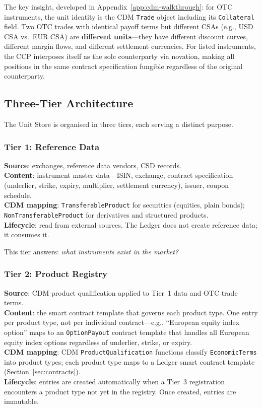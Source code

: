 \documentclass[11pt,a4paper]{article}
\begin{document}
\medskip
\noindent The key insight, developed in Appendix~\ref{app:cdm-walkthrough}: for OTC instruments, the unit identity is the CDM \texttt{Trade} object including its \texttt{Collateral} field. Two OTC trades with identical payoff terms but different CSAs (e.g., USD CSA vs.\ EUR CSA) are \textbf{different units}---they have different discount curves, different margin flows, and different settlement currencies. For listed instruments, the CCP interposes itself as the sole counterparty via novation, making all positions in the same contract specification fungible regardless of the original counterparty.

\subsection{Three-Tier Architecture}

The Unit Store is organised in three tiers, each serving a distinct purpose.

\subsubsection{Tier 1: Reference Data}

\textbf{Source}: exchanges, reference data vendors, CSD records.\\
\textbf{Content}: instrument master data---ISIN, exchange, contract specification (underlier, strike, expiry, multiplier, settlement currency), issuer, coupon schedule.\\
\textbf{CDM mapping}: \texttt{TransferableProduct} for securities (equities, plain bonds); \texttt{NonTransferableProduct} for derivatives and structured products.\\
\textbf{Lifecycle}: read from external sources. The Ledger does not create reference data; it consumes it.

This tier answers: \emph{what instruments exist in the market?}

\subsubsection{Tier 2: Product Registry}

\textbf{Source}: CDM product qualification applied to Tier~1 data and OTC trade terms.\\
\textbf{Content}: the smart contract template that governs each product type. One entry per product type, not per individual contract---e.g., ``European equity index option'' maps to an \texttt{OptionPayout} contract template that handles all European equity index options regardless of underlier, strike, or expiry.\\
\textbf{CDM mapping}: CDM \texttt{ProductQualification} functions classify \texttt{EconomicTerms} into product types; each product type maps to a Ledger smart contract template (Section~\ref{sec:contracts}).\\
\textbf{Lifecycle}: entries are created automatically when a Tier~3 registration encounters a product type not yet in the registry. Once created, entries are immutable.
\end{document}
